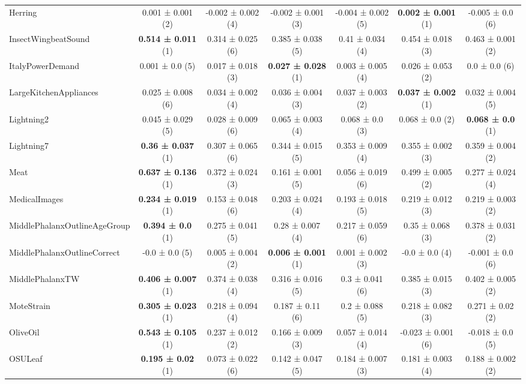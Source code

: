 \begin{table}[ht]
\begin{adjustbox}{width=\textwidth}
\begin{tabular}{lcccccc}
    Herring & 0.001 ± 0.001 (2) & -0.002 ± 0.002 (4) & -0.002 ± 0.001 (3) & -0.004 ± 0.002 (5) & \textbf{0.002 ± 0.001} (1) & -0.005 ± 0.0 (6) \\
    InsectWingbeatSound & \textbf{0.514 ± 0.011} (1) & 0.314 ± 0.025 (6) & 0.385 ± 0.038 (5) & 0.41 ± 0.034 (4) & 0.454 ± 0.018 (3) & 0.463 ± 0.001 (2) \\
    ItalyPowerDemand & 0.001 ± 0.0 (5) & 0.017 ± 0.018 (3) & \textbf{0.027 ± 0.028} (1) & 0.003 ± 0.005 (4) & 0.026 ± 0.053 (2) & 0.0 ± 0.0 (6) \\
    LargeKitchenAppliances & 0.025 ± 0.008 (6) & 0.034 ± 0.002 (4) & 0.036 ± 0.004 (3) & 0.037 ± 0.003 (2) & \textbf{0.037 ± 0.002} (1) & 0.032 ± 0.004 (5) \\
    Lightning2 & 0.045 ± 0.029 (5) & 0.028 ± 0.009 (6) & 0.065 ± 0.003 (4) & 0.068 ± 0.0 (3) & 0.068 ± 0.0 (2) & \textbf{0.068 ± 0.0} (1) \\
    Lightning7 & \textbf{0.36 ± 0.037} (1) & 0.307 ± 0.065 (6) & 0.344 ± 0.015 (5) & 0.353 ± 0.009 (4) & 0.355 ± 0.002 (3) & 0.359 ± 0.004 (2) \\
    Meat & \textbf{0.637 ± 0.136} (1) & 0.372 ± 0.024 (3) & 0.161 ± 0.001 (5) & 0.056 ± 0.019 (6) & 0.499 ± 0.005 (2) & 0.277 ± 0.024 (4) \\
    MedicalImages & \textbf{0.234 ± 0.019} (1) & 0.153 ± 0.048 (6) & 0.203 ± 0.024 (4) & 0.193 ± 0.018 (5) & 0.219 ± 0.012 (3) & 0.219 ± 0.003 (2) \\
    MiddlePhalanxOutlineAgeGroup & \textbf{0.394 ± 0.0} (1) & 0.275 ± 0.041 (5) & 0.28 ± 0.007 (4) & 0.217 ± 0.059 (6) & 0.35 ± 0.068 (3) & 0.378 ± 0.031 (2) \\
    MiddlePhalanxOutlineCorrect & -0.0 ± 0.0 (5) & 0.005 ± 0.004 (2) & \textbf{0.006 ± 0.001} (1) & 0.001 ± 0.002 (3) & -0.0 ± 0.0 (4) & -0.001 ± 0.0 (6) \\
    MiddlePhalanxTW & \textbf{0.406 ± 0.007} (1) & 0.374 ± 0.038 (4) & 0.316 ± 0.016 (5) & 0.3 ± 0.041 (6) & 0.385 ± 0.015 (3) & 0.402 ± 0.005 (2) \\
    MoteStrain & \textbf{0.305 ± 0.023} (1) & 0.218 ± 0.094 (4) & 0.187 ± 0.11 (6) & 0.2 ± 0.088 (5) & 0.218 ± 0.082 (3) & 0.271 ± 0.02 (2) \\
    OliveOil & \textbf{0.543 ± 0.105} (1) & 0.237 ± 0.012 (2) & 0.166 ± 0.009 (3) & 0.057 ± 0.014 (4) & -0.023 ± 0.001 (6) & -0.018 ± 0.0 (5) \\
    OSULeaf & \textbf{0.195 ± 0.02} (1) & 0.073 ± 0.022 (6) & 0.142 ± 0.047 (5) & 0.184 ± 0.007 (3) & 0.181 ± 0.003 (4) & 0.188 ± 0.002 (2) \\

\end{tabular}
\end{adjustbox}
\end{table}
